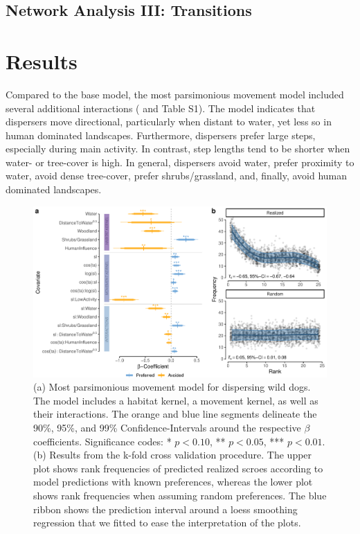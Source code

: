 \documentclass[abstract=on,10pt,a4paper,bibliography=totocnumbered]{article}
\begin{document}
\subsection{Network Analysis III: Transitions}



\section{Results}
Compared to the base model, the most parsimonious movement model included
several additional interactions ( and Table S1). The model
indicates that dispersers move directional, particularly when distant to water,
yet less so in human dominated landscapes. Furthermore, dispersers prefer large
steps, especially during main activity. In contrast, step lengths tend to be
shorter when water- or tree-cover is high. In general, dispersers avoid water,
prefer proximity to water, avoid dense tree-cover, prefer shrubs/grassland, and,
finally, avoid human dominated landscapes.

\begin{figure}
  \begin{center}
    \includegraphics[width=\textwidth]{99_MovementModel}
    \caption{(a) Most parsimonious movement model for dispersing wild dogs. The
    model includes a habitat kernel, a movement kernel, as well as their
    interactions. The orange and blue line segments delineate the 90\%, 95\%,
    and 99\% Confidence-Intervals around the respective \(\beta\) coefficients.
    Significance codes: * \(p < 0.10\), ** \(p < 0.05\), *** \(p < 0.01\). (b)
    Results from the k-fold cross validation procedure. The upper plot shows
    rank frequencies of predicted realized scroes according to model predictions
    with known preferences, whereas the lower plot shows rank frequencies when
    assuming random preferences. The blue ribbon shows the prediction interval
    around a loess smoothing regression that we fitted to ease the
    interpretation of the plots.}
    \label{MovementModel}
  \end{center}
\end{figure}
\end{document}
